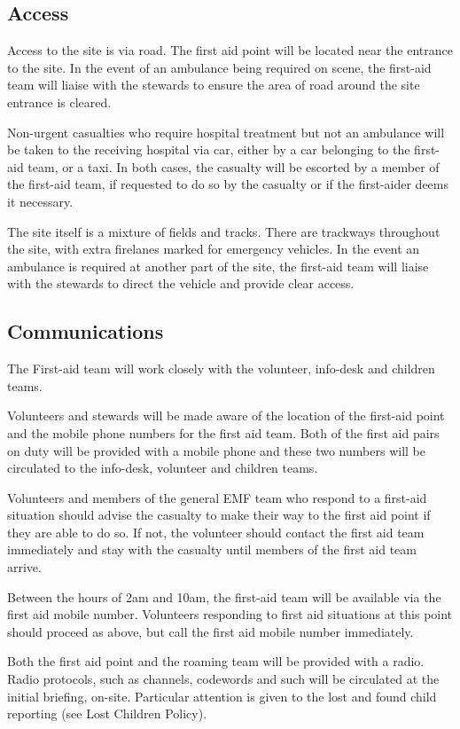 \subsection{Access}

Access to the site is via road. The first aid point will be located near the
entrance to the site. In the event of an ambulance being required on scene, the
first-aid team will liaise with the stewards to ensure the area of road around
the site entrance is cleared.

Non-urgent casualties who require hospital treatment but not an ambulance will
be taken to the receiving hospital via car, either by a car belonging to the
first-aid team, or a taxi. In both cases, the casualty will be escorted by a
member of the first-aid team, if requested to do so by the casualty or if the
first-aider deems it necessary.

The site itself is a mixture of fields and tracks. There are
trackways throughout the site, with extra firelanes marked for emergency
vehicles. In the event an ambulance is required at another part of the site,
the first-aid team will liaise with the stewards to direct the vehicle and
provide clear access.

\subsection{Communications}

The First-aid team will work closely with the volunteer, info-desk and children
teams.

Volunteers and stewards will be made aware of the location of the first-aid
point and the mobile phone numbers for the first aid team. Both of the first
aid pairs on duty will be provided with a mobile phone and these two numbers
will be circulated to the info-desk, volunteer and children teams.

Volunteers and members of the general EMF team who respond to a first-aid
situation should advise the casualty to make their way to the first aid point
if they are able to do so. If not, the volunteer should contact the first aid
team immediately and stay with the casualty until members of the first aid team
arrive.

Between the hours of 2am and 10am, the first-aid team will be available via the
first aid mobile number. Volunteers responding to first aid situations at this
point should proceed as above, but call the first aid mobile number
immediately.

Both the first aid point and the roaming team will be provided with a radio.
Radio protocols, such as channels, codewords and such will be circulated at the
initial briefing, on-site. Particular attention is given to the lost and found
child reporting (see Lost Children Policy).

